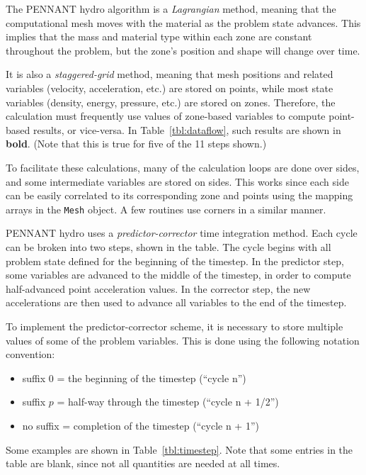 \documentclass[11pt,letterpaper]{article}
\begin{document}
The PENNANT hydro algorithm is a {\em Lagrangian} method, meaning that
the computational mesh moves with the material as the problem state
advances.  This implies that the mass and material type within each zone
are constant throughout the problem, but the zone's position and shape
will change over time.

It is also a {\em staggered-grid} method, meaning that mesh positions and
related variables (velocity, acceleration, etc.) are stored on points,
while most state variables (density, energy, pressure, etc.) are stored
on zones.  Therefore, the calculation must frequently use values of
zone-based variables to compute point-based results, or vice-versa.
In Table~\ref{tbl:dataflow}, such results are shown in {\bf bold}.
(Note that this is true for five of the 11 steps shown.)

To facilitate these calculations, many of the calculation loops are done
over sides, and some intermediate variables are stored on sides.
This works since each side can be easily correlated to its
corresponding zone and points using the mapping arrays in the {\tt Mesh}
object.  A few routines use corners in a similar manner.

PENNANT hydro uses a {\em predictor-corrector} time integration
method.  Each cycle can be broken into two steps, shown in the table.
The cycle begins with all problem state defined for the beginning of the
timestep.  In the predictor step, some variables are advanced to the
middle of the timestep, in order to compute half-advanced point
acceleration values.  In the corrector step, the new accelerations are
then used to advance all variables to the end of the timestep.

To implement the predictor-corrector scheme, it is necessary to store
multiple values of some of the problem variables.  This is done
using the following notation convention:
\begin{itemize}
\item suffix $0$ = the beginning of the timestep (``cycle n'')
\item suffix $p$ = half-way through the timestep (``cycle n + 1/2'')
\item no suffix = completion of the timestep    (``cycle n + 1'')
\end{itemize}
Some examples are shown in Table~\ref{tbl:timestep}.
Note that some entries in the table are blank, since not all quantities
are needed at all times.
\end{document}
